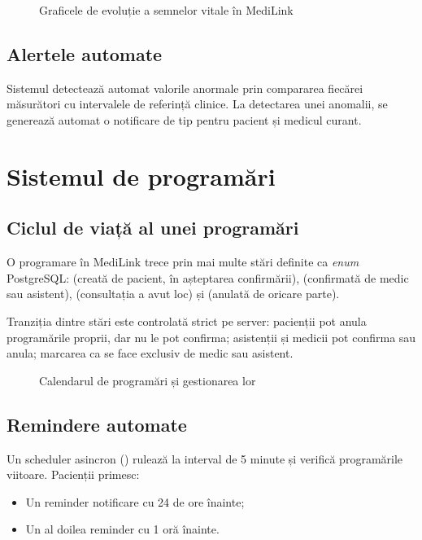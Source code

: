 \begin{figure}[H]
  \centering
  \caption{Graficele de evoluție a semnelor vitale în MediLink}
  \label{fig:semne_vitale}
\end{figure}

\subsection{Alertele automate}

Sistemul detectează automat valorile anormale prin compararea fiecărei măsurători cu intervalele de referință clinice. La detectarea unei anomalii, se generează automat o notificare de tip  pentru pacient și medicul curant.

\section{Sistemul de programări}

\subsection{Ciclul de viață al unei programări}

O programare în MediLink trece prin mai multe stări definite ca \textit{enum} PostgreSQL:  (creată de pacient, în așteptarea confirmării),  (confirmată de medic sau asistent),  (consultația a avut loc) și  (anulată de oricare parte).

Tranziția dintre stări este controlată strict pe server: pacienții pot anula programările proprii, dar nu le pot confirma; asistenții și medicii pot confirma sau anula; marcarea ca  se face exclusiv de medic sau asistent.

\begin{figure}[H]
  \centering
  \caption{Calendarul de programări și gestionarea lor}
  \label{fig:programari}
\end{figure}

\subsection{Remindere automate}

Un scheduler asincron () rulează la interval de 5 minute și verifică programările viitoare. Pacienții primesc:
\begin{itemize}
  \item Un reminder notificare cu 24 de ore înainte;
  \item Un al doilea reminder cu 1 oră înainte.
\end{itemize}

